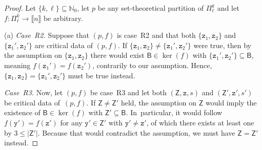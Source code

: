 \documentclass[10pt,a4paper]{amsart}
\numberwithin{equation}{section}
\newcommand{\nnint}{{\mathbb{N}_0}}
\newcommand{\dwi}[1]{\llbracket{#1}\rrbracket}
\newcommand{\xfromto}[3]{#1 \colon  #2 \to #3}
\newcommand{\subproof}[1]{\textit{#1}}
\newcommand{\tsopx}[2]{\Pi^{#1}_{#2}}
\newcommand{\Yp}[1]{\mathtt{#1}}
\newcommand{\Yb}[1]{\mathsf{#1}}
\newcommand{\kerp}[1]{\ker(#1)}
\newcommand{\thedim}{n}
\newcommand{\scenariotwo}{R2}
\newcommand{\scenariothree}{R3}
\begin{document}
\begin{proof}
  \newcommand{\inlen}{k}
  \newcommand{\outlen}{\ell}
  \newcommand{\theind}{f}
  \newcommand{\theindx}[1]{f(#1)}
  \newcommand{\thepoint}{\Yp{z}}
  \newcommand{\thevalue}{s}
  \newcommand{\thepartition}{p}
  \newcommand{\thelong}{\Yb{Z}}
  \newcommand{\firstspecialpoint}{\Yp{z}_1}
  \newcommand{\secondspecialpoint}{\Yp{z}_2}
  \newcommand{\anypoint}{\Yp{y}}
  \newcommand{\someblock}{\Yb{B}}
  \newcommand{\anyblock}{\Yb{A}}
  \newcommand{\alternativefirstspecialpoint}{\Yp{z}_1'}
  \newcommand{\alternativesecondspecialpoint}{\Yp{z}_2'}
  \newcommand{\alternativelong}{\Yb{Z}'}
  \newcommand{\alternativepoint}{\Yp{z}'}
  \newcommand{\alternativevalue}{s'}
  \newcommand{\alternativeanypoint}{\Yp{y}'}
  Let $\{\inlen,\outlen\}\subseteq \nnint$, let $\thepartition$ be any set-theoretical partition of $\tsopx{\inlen}{\outlen}$ and let $\xfromto{\theind}{\tsopx{\inlen}{\outlen}}{\dwi{\thedim}}$ be arbitrary.

  (a)
 \subproof{Case~\scenariotwo{}.} Suppose that $(\thepartition,\theind)$ is case~\scenariotwo{} and that both $\{\firstspecialpoint,\secondspecialpoint\}$ and  $\{\alternativefirstspecialpoint,\alternativesecondspecialpoint\}$ are critical data of $(\thepartition,\theind)$. If $\{\firstspecialpoint,\secondspecialpoint\}\neq \{\alternativefirstspecialpoint,\alternativesecondspecialpoint\}$ were true, then by the assumption on $\{\firstspecialpoint,\secondspecialpoint\}$ there would exist $\someblock\in\ker(\theind)$ with $\{\alternativefirstspecialpoint,\alternativesecondspecialpoint\}\subseteq \someblock$, meaning $\theind(\alternativefirstspecialpoint)=\theind(\alternativesecondspecialpoint)$, contrarily to our assumption. Hence, $\{\firstspecialpoint,\secondspecialpoint\}= \{\alternativefirstspecialpoint,\alternativesecondspecialpoint\}$ must be true instead.

 \subproof{Case~\scenariothree{}.} Now, let $(\thepartition,\theind)$ be case~\scenariothree{} and let both $(\thelong,\thepoint,\thevalue)$ and $(\alternativelong,\alternativepoint,\alternativevalue)$ be critical data of~$(\thepartition,\theind)$.
 If $\thelong\neq\alternativelong$ held, the assumption on $\thelong$ would imply the existence of $\someblock\in\kerp{\theind}$ with $\alternativelong\subseteq \someblock$. In~particular, it would follow $\theind(\alternativeanypoint)=\theind(\alternativepoint)$ for any $\alternativeanypoint\in \alternativelong$ with $\alternativeanypoint\neq\alternativepoint$, of which there exists at least one by $3\leq |\alternativelong|$. Because that would contradict the assumption, we must have $\thelong=\alternativelong$ instead.


\end{proof}
\end{document}
